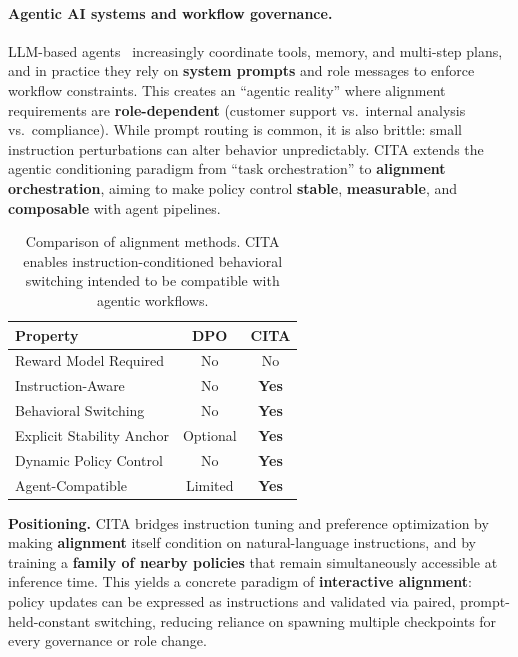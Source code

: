 \paragraph{Agentic AI systems and workflow governance.}
LLM-based agents~\cite{wang2024survey,xi2023rise} increasingly coordinate tools, memory, and multi-step plans, and in practice they rely on \textbf{system prompts} and role messages to enforce workflow constraints. This creates an ``agentic reality'' where alignment requirements are \textbf{role-dependent} (customer support vs.\ internal analysis vs.\ compliance). While prompt routing is common, it is also brittle: small instruction perturbations can alter behavior unpredictably. CITA extends the agentic conditioning paradigm from ``task orchestration'' to \textbf{alignment orchestration}, aiming to make policy control \textbf{stable}, \textbf{measurable}, and \textbf{composable} with agent pipelines.

\vspace{-2mm}
\begin{table}[ht!]
\centering
\small
\renewcommand{\arraystretch}{1.2}
\begin{tabular}{@{}lcc@{}}
\toprule
\textbf{Property} & \textbf{DPO} & \textbf{CITA} \\
\midrule
Reward Model Required & No & No \\ \hline
Instruction-Aware & No & \textbf{Yes} \\ \hline
Behavioral Switching & No & \textbf{Yes} \\ \hline
Explicit Stability Anchor & Optional & \textbf{Yes} \\ \hline
Dynamic Policy Control & No & \textbf{Yes} \\ \hline
Agent-Compatible & Limited & \textbf{Yes} \\
\bottomrule
\end{tabular}
\caption{Comparison of alignment methods. CITA enables instruction-conditioned behavioral switching intended to be compatible with agentic workflows.}
\label{tab:method_comparison}
\vspace{-4mm}
\end{table}

\noindent\textbf{Positioning.}
CITA bridges instruction tuning and preference optimization by making \textbf{alignment} itself condition on natural-language instructions, and by training a \textbf{family of nearby policies} that remain simultaneously accessible at inference time. This yields a concrete paradigm of \textbf{interactive alignment}: policy updates can be expressed as instructions and validated via paired, prompt-held-constant switching, reducing reliance on spawning multiple checkpoints for every governance or role change.




